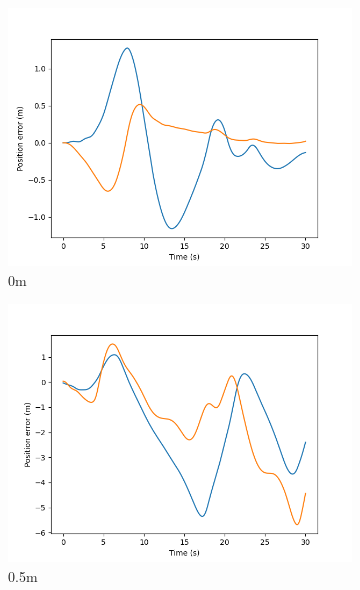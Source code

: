 \documentclass[class=article, crop=false]{standalone}
\begin{document}
\begin{figure}
    \centering
    \begin{subfigure}[b]{0.48\textwidth}
        \centering
        \includegraphics{scenario1/rov-100m/0.0m/rov_position_error_controlled}
        \caption{0m}
        \label{}
    \end{subfigure}
    \hfill
    \begin{subfigure}[b]{0.48\textwidth}
        \centering
        \includegraphics{scenario1/rov-100m/0.5m/rov_position_error_controlled}
        \caption{0.5m}
        \label{}
    \end{subfigure}
    \vfill
    \begin{subfigure}[b]{0.48\textwidth}
        \centering

\end{subfigure}
\end{figure}
\end{document}
